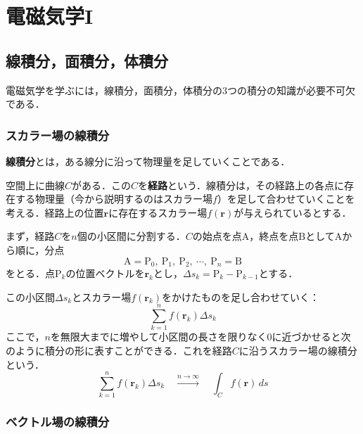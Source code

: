 \chapter{電磁気学I}
\setcounter{page}{1}

\section{線積分，面積分，体積分}

電磁気学を学ぶには，線積分，面積分，体積分の3つの積分の知識が必要不可欠である．



\subsection{スカラー場の線積分}

\textbf{線積分}とは，ある線分に沿って物理量を足していくことである．

空間上に曲線$C$がある．この$C$を\textbf{経路}という．線積分は，その経路上の各点に存在する物理量（今から説明するのはスカラー場$f$）を足して合わせていくことを考える．経路上の位置$\bm{r}$に存在するスカラー場$f(\bm{r})$が与えられているとする．

まず，経路$C$を$n$個の小区間に分割する．$C$の始点を点$\mathrm{A}$，終点を点$\mathrm{B}$として$\mathrm{A}$から順に，分点
\begin{equation*}
	\mathrm{A} = \mathrm{P}_0,\ \mathrm{P}_1,\ \mathrm{P}_2,\ \cdots,\ \mathrm{P}_n = \mathrm{B}
\end{equation*}
をとる．点$\mathrm{P}_k$の位置ベクトルを$\bm{r}_k$とし，$\varDelta s_k = \mathrm{P}_k - \mathrm{P}_{k - 1}$とする．

この小区間$\varDelta s_k$とスカラー場$f(\bm{r}_k)$をかけたものを足し合わせていく：
\begin{equation*}
	\sum_{k = 1}^{n} f(\bm{r}_k)\varDelta s_k
\end{equation*}
ここで，$n$を無限大までに増やして小区間の長さを限りなく0に近づかせると次のように積分の形に表すことができる．これを経路$C$に沿うスカラー場の線積分という．
\begin{equation}
	\sum_{k = 1}^{n} f(\bm{r}_k)\varDelta s_k \quad\xrightarrow{n \to \infty}\quad \int_{C} f(\bm{r})\,ds
\end{equation}



\subsection{ベクトル場の線積分}

